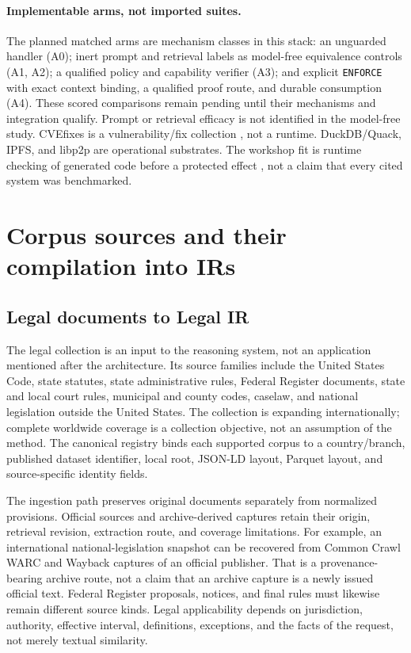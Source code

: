 \documentclass{article}
\begin{document}
\paragraph{Implementable arms, not imported suites.}
The planned matched arms are mechanism classes in this stack: an unguarded handler (A0); inert prompt and retrieval labels as model-free equivalence controls (A1, A2); a qualified policy and capability verifier (A3); and explicit \texttt{ENFORCE} with exact context binding, a qualified proof route, and durable consumption (A4). These scored comparisons remain pending until their mechanisms and integration qualify. Prompt or retrieval efficacy is not identified in the model-free study. CVEfixes is a vulnerability/fix collection \citep{cvefixes}, not a runtime. DuckDB/Quack, IPFS, and libp2p \citep{quack,ipfs,libp2p} are operational substrates. The workshop fit is runtime checking of generated code before a protected effect \citep{vericode2026cfp}, not a claim that every cited system was benchmarked.

\section{Corpus sources and their compilation into IRs}

\subsection{Legal documents to Legal IR}

The legal collection is an input to the reasoning system, not an application mentioned after the architecture. Its source families include the United States Code, state statutes, state administrative rules, Federal Register documents, state and local court rules, municipal and county codes, caselaw, and national legislation outside the United States. The collection is expanding internationally; complete worldwide coverage is a collection objective, not an assumption of the method. The canonical registry binds each supported corpus to a country/branch, published dataset identifier, local root, JSON-LD layout, Parquet layout, and source-specific identity fields.

The ingestion path preserves original documents separately from normalized provisions. Official sources and archive-derived captures retain their origin, retrieval revision, extraction route, and coverage limitations. For example, an international national-legislation snapshot can be recovered from Common Crawl WARC and Wayback captures of an official publisher. That is a provenance-bearing archive route, not a claim that an archive capture is a newly issued official text. Federal Register proposals, notices, and final rules must likewise remain different source kinds. Legal applicability depends on jurisdiction, authority, effective interval, definitions, exceptions, and the facts of the request, not merely textual similarity.
\end{document}
